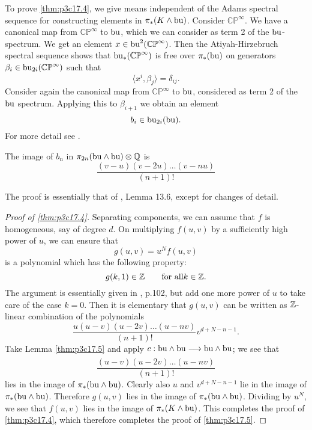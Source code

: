 \documentclass[../main]{subfiles}
\begin{document}
To prove \ref{thm:p3c17.4}, we give means independent of the Adams spectral sequence for constructing elements in $\pi_\ast(K \wedge \mathrm{bu})$. Consider $\mathbb {CP}^\infty$. We have a canonical map from $\mathbb {CP}^\infty$ to $\mathrm{bu}$, which we can consider as term 2 of the $\mathrm{bu}$-spectrum. We get an element $x \in \mathrm{bu}^2(\mathbb {CP}^\infty)$. Then the Atiyah-Hirzebruch spectral sequence shows that $\mathrm{bu}_\ast(\mathbb {CP}^\infty)$ is free over $\pi_\ast(\mathrm{bu})$ on generators $\beta_i \in \mathrm{bu}_{2i}(\mathbb {CP}^\infty)$ such that \[\langle x^i, \beta_j\rangle = \delta_{ij}.\] Consider again the canonical map from $\mathbb {CP}^\infty$ to $\mathrm{bu}$, considered as term 2 of the $\mathrm{bu}$ spectrum. Applying this to $\beta_{i + 1}$ we obtain an element \[b_i \in \mathrm{bu}_{2i}(\mathrm{bu}).\] For more detail see \cite{quillen}.

\begin{lemma}
The image of $b_n$ in $\pi_{2n}(\mathrm{bu} \wedge \mathrm{bu}) \otimes \mathbb{Q}$ is \[\frac {(v - u)(v - 2u) \ldots (v - nu)} {(n + 1)!}\]
\end{lemma}

The proof is essentially that of \cite{quillen}, Lemma 13.6, except for changes of detail. 

\begin{proof}[Proof of \ref{thm:p3c17.4}]
Separating components, we can assume that $f$ is homogeneous, say of degree $d$. On multiplying $f(u, v)$ by a sufficiently high power of $u$, we can ensure that \[g(u,v) = u^N f(u, v)\] is a polynomial which has the following property: \[g(k, 1) \in \mathbb{Z} \qquad \text {for all} k \in \mathbb{Z}.\] The argument is essentially given in \cite{quillen}, p.102, but add one more power of $u$ to take care of the case $k = 0$. Then it is elementary that $g(u, v)$ can be written as $\mathbb{Z}$-linear combination of the polynomials \[\frac {u(u - v)(u - 2v) \ldots (u - nv)} {(n + 1)!} v^{d + N - n - 1}.\] 
Take Lemma \ref{thm:p3c17.5} and apply $c : \te{bu} \wedge \te{bu} \lar{} \te{bu} \wedge \te{bu}$; we see that \[\frac {(u - v)(u - 2v) \ldots (u - nv)} {(n+1)!}\] lies in the image of $\pi_\ast(\mathrm{bu} \wedge \mathrm{bu})$. Clearly also $u$ and $v^{d + N - n - 1}$ lie in the image of $\pi_\ast(\mathrm{bu} \wedge \mathrm{bu})$. Therefore $g(u, v)$ lies in the image of $\pi_\ast(\mathrm{bu} \wedge \mathrm{bu})$. Dividing by $u^N$, we see that $f(u,v)$ lies in the image of $\pi_\ast(K \wedge \mathrm{bu})$. This completes the proof of \ref{thm:p3c17.4}, which therefore completes the proof of \ref{thm:p3c17.5}. 
\end{proof}
\end{document}

